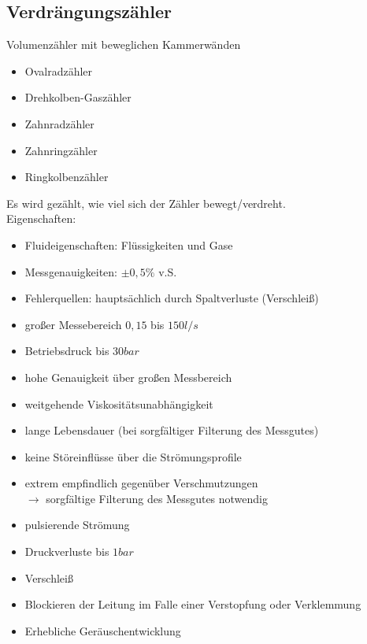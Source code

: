 \subsection{Verdrängungszähler}
Volumenzähler mit beweglichen Kammerwänden
\begin{itemize}
\item Ovalradzähler
\item Drehkolben-Gaszähler
\item Zahnradzähler
\item Zahnringzähler
\item Ringkolbenzähler
\end{itemize}
Es wird gezählt, wie viel sich der Zähler bewegt/verdreht.\\
Eigenschaften:
\begin{itemize}
\item Fluideigenschaften: Flüssigkeiten und Gase
\item Messgenauigkeiten: $\pm 0,5\%$ v.S.
\item Fehlerquellen: hauptsächlich durch Spaltverluste (Verschleiß)
\end{itemize}
\begin{itemize}[label=$+$]
\item großer Messebereich $0,15$ bis $150 \unit{l/s}$
\item Betriebsdruck bis $30 \unit{bar}$
\item hohe Genauigkeit über großen Messbereich
\item weitgehende Viskositätsunabhängigkeit
\item lange Lebensdauer (bei sorgfältiger Filterung des Messgutes)
\item keine Störeinflüsse über die Strömungsprofile
\end{itemize}
\begin{itemize}[label=$-$]
\item extrem empfindlich gegenüber Verschmutzungen\\
$\to$ sorgfältige Filterung des Messgutes notwendig
\item pulsierende Strömung
\item Druckverluste bis $1 \unit{bar}$
\item Verschleiß
\item Blockieren der Leitung im Falle einer Verstopfung oder Verklemmung
\item Erhebliche Geräuschentwicklung
\end{itemize}
